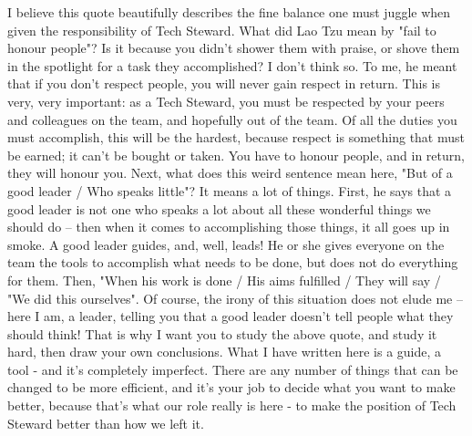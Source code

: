 \documentclass[letterpaper,10pt,oneside,headsepline]{scrreprt}
\begin{document}
I believe this quote beautifully describes the fine balance one must juggle when given the responsibility of Tech Steward. What did Lao Tzu mean by "fail to honour people"? Is it because you didn't shower them with praise, or shove them in the spotlight for a task they accomplished? I don't think so. To me, he meant that if you don't respect people, you will never gain respect in return. This is very, very important: as a Tech Steward, you must be respected by your peers and colleagues on the team, and hopefully out of the team. Of all the duties you must accomplish, this will be the hardest, because respect is something that must be earned; it can't be bought or taken. You have to honour people, and in return, they will honour you. Next, what does this weird sentence mean here, "But of a good leader / Who speaks little"? It means a lot of things. First, he says that a good leader is not one who speaks a lot about all these wonderful things we should do -- then when it comes to accomplishing those things, it all goes up in smoke. A good leader guides, and, well, leads! He or she gives everyone on the team the tools to accomplish what needs to be done, but does not do everything for them. Then, "When his work is done / His aims fulfilled / They will say / "We did this ourselves". Of course, the irony of this situation does not elude me -- here I am, a leader, telling you that a good leader doesn't tell people what they should think! That is why I want you to study the above quote, and study it hard, then draw your own conclusions. What I have written here is a guide, a tool - and it's completely imperfect. There are any number of things that can be changed to be more efficient, and it's your job to decide what you want to make better, because that's what our role really is here - to make the position of Tech Steward better than how we left it.
\end{document}
